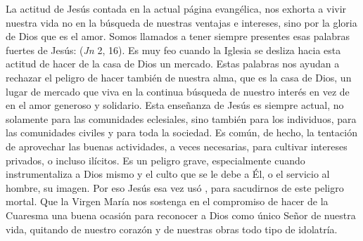 \begin{body}
La actitud de Jesús contada en la actual página evangélica, nos exhorta a vivir nuestra vida no en la búsqueda de nuestras ventajas e intereses, sino por la gloria de Dios que es el amor. Somos llamados a tener siempre presentes esas palabras fuertes de Jesús:  (\textit{Jn} 2, 16). Es muy feo cuando la Iglesia se desliza hacia esta actitud de hacer de la casa de Dios un mercado. Estas palabras nos ayudan a rechazar el peligro de hacer también de nuestra alma, que es la casa de Dios, un lugar de mercado que viva en la continua búsqueda de nuestro interés en vez de en el amor generoso y solidario. Esta enseñanza de Jesús es siempre actual, no solamente para las comunidades eclesiales, sino también para los individuos, para las comunidades civiles y para toda la sociedad. Es común, de hecho, la tentación de aprovechar las buenas actividades, a veces necesarias, para cultivar intereses privados, o incluso ilícitos. Es un peligro grave, especialmente cuando instrumentaliza a Dios mismo y el culto que se le debe a Él, o el servicio al hombre, su imagen. Por eso Jesús esa vez usó , para sacudirnos de este peligro mortal. Que la Virgen María nos sostenga en el compromiso de hacer de la Cuaresma una buena ocasión para reconocer a Dios como único Señor de nuestra vida, quitando de nuestro corazón y de nuestras obras todo tipo de idolatría.
\end{body}

